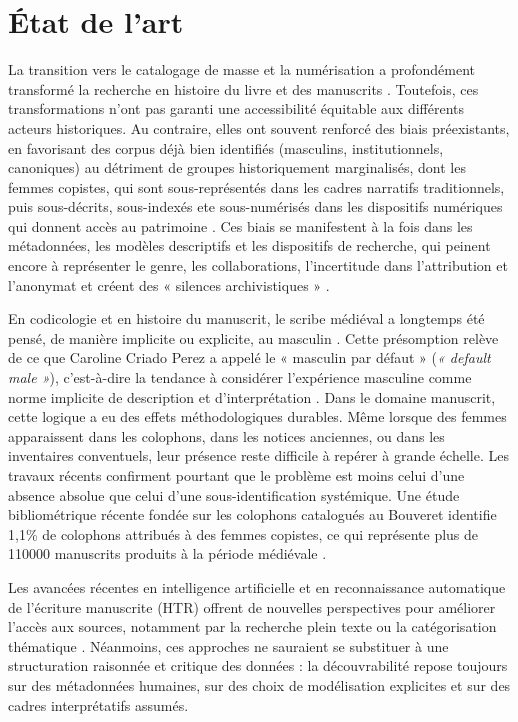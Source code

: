\documentclass[final, fra]{anthology-ch}      %
\begin{document}
\section{État de l’art}
La transition vers le catalogage de masse et la numérisation a profondément transformé la recherche en histoire du livre et des manuscrits \cite{Thylstrup2019PoliticsDigitization}. Toutefois, ces transformations n’ont pas garanti une accessibilité équitable aux différents acteurs historiques. Au contraire, elles ont souvent renforcé des biais préexistants, en favorisant des corpus déjà bien identifiés (masculins, institutionnels, canoniques) au détriment de groupes historiquement marginalisés, dont les femmes copistes, qui sont sous-représentés dans les cadres narratifs traditionnels, puis sous-décrits, sous-indexés ete sous-numérisés dans les dispositifs numériques qui donnent accès au patrimoine \cite{RisamBordalejo2019IntersectionalityDH, Manoff2016ArchivalSilence, Cook2011ArchivalAppraisal, BowkerStar1999SortingThingsOut}. Ces biais se manifestent à la fois dans les métadonnées, les modèles descriptifs et les dispositifs de recherche, qui peinent encore à représenter le genre, les collaborations, l’incertitude dans l’attribution et l’anonymat et créent des « silences archivistiques » \cite{Manoff2016ArchivalSilence}. 

En codicologie et en histoire du manuscrit, le scribe médiéval a longtemps été pensé, de manière implicite ou explicite, au masculin \cite{Moreton2013NunBookProduction, Treharne2022}. Cette présomption relève de ce que Caroline Criado Perez a appelé le  « masculin par défaut » (\textit{« default male »}), c’est-à-dire la tendance à considérer l’expérience masculine comme norme implicite de description et d’interprétation \cite{CriadoPerez2019InvisibleWomen}. Dans le domaine manuscrit, cette logique a eu des effets méthodologiques durables. Même lorsque des femmes apparaissent dans les colophons, dans les notices anciennes, ou dans les inventaires conventuels, leur présence reste difficile à repérer à grande échelle. Les travaux récents confirment pourtant que le problème est moins celui d’une absence absolue que celui d’une sous-identification systémique. Une étude bibliométrique récente fondée sur les colophons catalogués au Bouveret \cite{Bouveret1965Colophons} identifie 1,1\% de colophons attribués à des femmes copistes, ce qui représente plus de 110000 manuscrits produits à la période médiévale \cite{Ommundsen2025FemaleScribes}.

Les avancées récentes en intelligence artificielle et en reconnaissance automatique de l’écriture manuscrite (HTR) offrent de nouvelles perspectives pour améliorer l’accès aux sources, notamment par la recherche plein texte ou la catégorisation thématique \cite{Muehlberger2014HTR, Terras2022HTRLibrary, HuistraMellink2016PhrasingHistory, Muehlberger2019Transkribus}. Néanmoins, ces approches ne sauraient se substituer à une structuration raisonnée et critique des données : la découvrabilité repose toujours sur des métadonnées humaines, sur des choix de modélisation explicites et sur des cadres interprétatifs assumés. 
\end{document}
